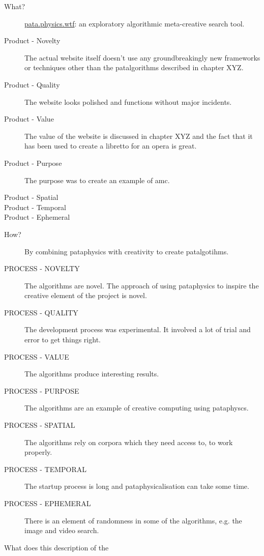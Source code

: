 \begin{description}
  \item[What?] \url{pata.physics.wtf}: an exploratory algorithmic meta-creative search tool.
  \item[Product - Novelty] The actual website itself doesn't use any groundbreakingly new frameworks or techniques other than the patalgorithms described in chapter XYZ. 
  \item[Product - Quality] The website looks polished and functions without major incidents.
  \item[Product - Value] The value of the website is discussed in chapter XYZ and the fact that it has been used to create a libretto for an opera is great.
  \item[Product - Purpose] The purpose was to create an example of \gls{amc}.
  \item[Product - Spatial] 
  \item[Product - Temporal]
  \item[Product - Ephemeral]
\end{description}

\spirals

\begin{description}
  \item[How?] By combining pataphysics with creativity to create patalgotihms.
  \item[PROCESS - NOVELTY] The algorithms are novel. The approach of using pataphysics to inspire the creative element of the project is novel.
  \item[PROCESS - QUALITY] The development process was experimental. It involved a lot of trial and error to get things right.
  \item[PROCESS - VALUE] The algorithms produce interesting results.
  \item[PROCESS - PURPOSE] The algorithms are an example of creative computing using pataphyscs.
  \item[PROCESS - SPATIAL] The algorithms rely on corpora which they need access to, to work properly.
  \item[PROCESS - TEMPORAL] The startup process is long and pataphysicalisation can take some time.
  \item[PROCESS - EPHEMERAL] There is an element of randomness in some of the algorithms, e.g. the image and video search.
\end{description}

What does this description of the 

